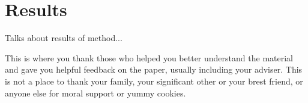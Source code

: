 \documentclass[sigplan,screen,nonacm]{acmart}
\begin{document}
\section{Results}

Talks about results of method...


\begin{acks}
This is where you thank those who helped you better understand the material 
and gave you helpful feedback on the paper, usually including your adviser. 
This is not a place to thank your family, your significant other or your brest friend, 
or anyone else  for moral support or yummy cookies. 
\end{acks}



\end{document}
